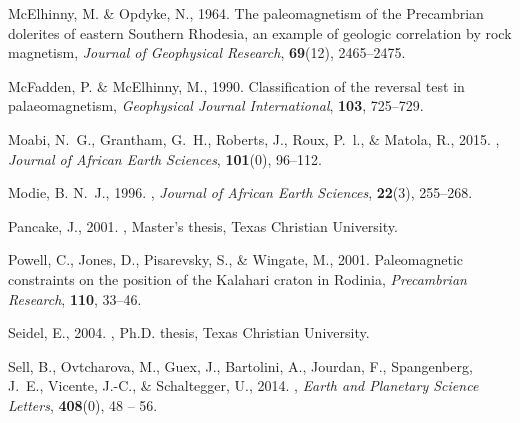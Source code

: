 \documentclass[11pt,letterpaper]{article}
\begin{document}
\begin{thebibliography}{49}
Mc{E}lhinny, M. \& Opdyke, N., 1964.
\newblock The paleomagnetism of the {P}recambrian dolerites of eastern
  {S}outhern {R}hodesia, an example of geologic correlation by rock magnetism,
  {\it Journal of Geophysical Research\/}, {\bf 69}(12), 2465--2475.
  
Mc{F}adden, P. \& Mc{E}lhinny, M., 1990.
\newblock Classification of the reversal test in palaeomagnetism, {\it
  Geophysical Journal International\/}, {\bf 103}, 725--729.

Moabi, N.~G., Grantham, G.~H., Roberts, J., Roux, P.~l., \& Matola, R., 2015.
, {\it Journal of African Earth Sciences\/}, {\bf 101}(0), 96--112.

Modie, B. N.~J., 1996.
, {\it Journal of African Earth
  Sciences\/}, {\bf 22}(3), 255--268.

Pancake, J., 2001.
, Master's thesis, Texas Christian
  University.

Powell, C., Jones, D., Pisarevsky, S., \& Wingate, M., 2001.
\newblock Paleomagnetic constraints on the position of the {K}alahari craton in
  {R}odinia, {\it Precambrian Research\/}, {\bf 110}, 33--46.

Seidel, E., 2004.
, Ph.D. thesis, Texas
  Christian University.

Sell, B., Ovtcharova, M., Guex, J., Bartolini, A., Jourdan, F., Spangenberg,
  J.~E., Vicente, J.-C., \& Schaltegger, U., 2014.
, {\it Earth and Planetary Science Letters\/}, {\bf 408}(0), 48
  -- 56.


\end{thebibliography}
\end{document}
